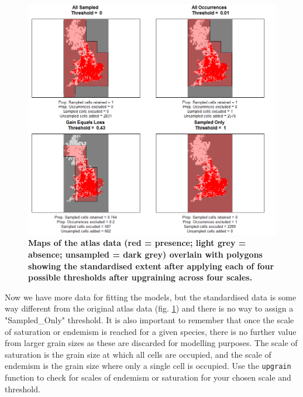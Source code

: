 \documentclass{article}[12pt, a4paper]
\begin{document}
\begin{figure}[ht]
\centering
\includegraphics[width=\linewidth]{Threshold_maps_4_scales.png}
\caption{\textbf{Maps of the atlas data (red = presence; light grey = absence; unsampled = dark grey) overlain with polygons showing the standardised extent after applying each of four possible thresholds after upgraining across four scales.}}
\label{fig:Threshold maps 4}
\end{figure}

Now we have more data for fitting the models, but the standardised data is some way different from the original atlas data (fig. \ref{fig:Threshold maps 4}) and there is no way to assign a "Sampled\_Only" threshold. It is also important to remember that once the scale of saturation or endemism is reached for a given species, there is no further value from larger grain sizes as these are discarded for modelling purposes. The scale of saturation is the grain size at which all cells are occupied, and the scale of endemism is the grain size where only a single cell is occupied. Use the \texttt{upgrain} function to check for scales of endemism or saturation for your chosen scale and threshold. 
\end{document}
